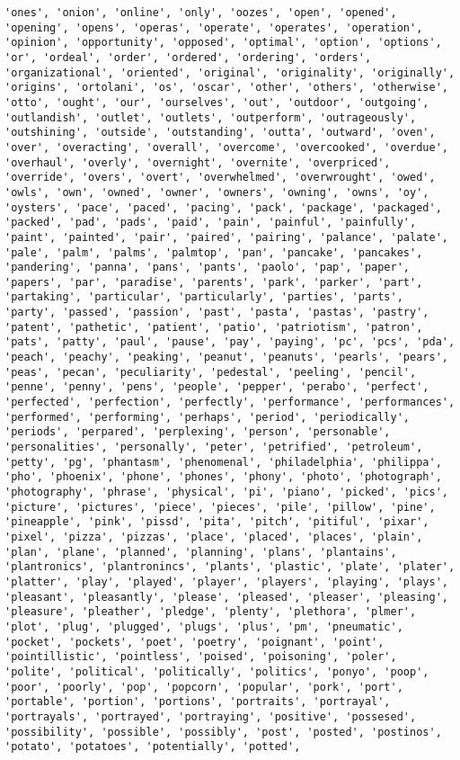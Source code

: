 \documentclass[11pt]{article}
\begin{document}
\begin{Verbatim}[commandchars=\\\{\}]
'ones', 'onion', 'online', 'only', 'oozes', 'open', 'opened', 'opening', 'opens', 'operas', 'operate', 'operates', 'operation', 'opinion', 'opportunity', 'opposed', 'optimal', 'option', 'options', 'or', 'ordeal', 'order', 'ordered', 'ordering', 'orders', 'organizational', 'oriented', 'original', 'originality', 'originally', 'origins', 'ortolani', 'os', 'oscar', 'other', 'others', 'otherwise', 'otto', 'ought', 'our', 'ourselves', 'out', 'outdoor', 'outgoing', 'outlandish', 'outlet', 'outlets', 'outperform', 'outrageously', 'outshining', 'outside', 'outstanding', 'outta', 'outward', 'oven', 'over', 'overacting', 'overall', 'overcome', 'overcooked', 'overdue', 'overhaul', 'overly', 'overnight', 'overnite', 'overpriced', 'override', 'overs', 'overt', 'overwhelmed', 'overwrought', 'owed', 'owls', 'own', 'owned', 'owner', 'owners', 'owning', 'owns', 'oy', 'oysters', 'pace', 'paced', 'pacing', 'pack', 'package', 'packaged', 'packed', 'pad', 'pads', 'paid', 'pain', 'painful', 'painfully', 'paint', 'painted', 'pair', 'paired', 'pairing', 'palance', 'palate', 'pale', 'palm', 'palms', 'palmtop', 'pan', 'pancake', 'pancakes', 'pandering', 'panna', 'pans', 'pants', 'paolo', 'pap', 'paper', 'papers', 'par', 'paradise', 'parents', 'park', 'parker', 'part', 'partaking', 'particular', 'particularly', 'parties', 'parts', 'party', 'passed', 'passion', 'past', 'pasta', 'pastas', 'pastry', 'patent', 'pathetic', 'patient', 'patio', 'patriotism', 'patron', 'pats', 'patty', 'paul', 'pause', 'pay', 'paying', 'pc', 'pcs', 'pda', 'peach', 'peachy', 'peaking', 'peanut', 'peanuts', 'pearls', 'pears', 'peas', 'pecan', 'peculiarity', 'pedestal', 'peeling', 'pencil', 'penne', 'penny', 'pens', 'people', 'pepper', 'perabo', 'perfect', 'perfected', 'perfection', 'perfectly', 'performance', 'performances', 'performed', 'performing', 'perhaps', 'period', 'periodically', 'periods', 'perpared', 'perplexing', 'person', 'personable', 'personalities', 'personally', 'peter', 'petrified', 'petroleum', 'petty', 'pg', 'phantasm', 'phenomenal', 'philadelphia', 'philippa', 'pho', 'phoenix', 'phone', 'phones', 'phony', 'photo', 'photograph', 'photography', 'phrase', 'physical', 'pi', 'piano', 'picked', 'pics', 'picture', 'pictures', 'piece', 'pieces', 'pile', 'pillow', 'pine', 'pineapple', 'pink', 'pissd', 'pita', 'pitch', 'pitiful', 'pixar', 'pixel', 'pizza', 'pizzas', 'place', 'placed', 'places', 'plain', 'plan', 'plane', 'planned', 'planning', 'plans', 'plantains', 'plantronics', 'plantronincs', 'plants', 'plastic', 'plate', 'plater', 'platter', 'play', 'played', 'player', 'players', 'playing', 'plays', 'pleasant', 'pleasantly', 'please', 'pleased', 'pleaser', 'pleasing', 'pleasure', 'pleather', 'pledge', 'plenty', 'plethora', 'plmer', 'plot', 'plug', 'plugged', 'plugs', 'plus', 'pm', 'pneumatic', 'pocket', 'pockets', 'poet', 'poetry', 'poignant', 'point', 'pointillistic', 'pointless', 'poised', 'poisoning', 'poler', 'polite', 'political', 'politically', 'politics', 'ponyo', 'poop', 'poor', 'poorly', 'pop', 'popcorn', 'popular', 'pork', 'port', 'portable', 'portion', 'portions', 'portraits', 'portrayal', 'portrayals', 'portrayed', 'portraying', 'positive', 'possesed', 'possibility', 'possible', 'possibly', 'post', 'posted', 'postinos', 'potato', 'potatoes', 'potentially', 'potted', 
\end{Verbatim}
\end{document}
